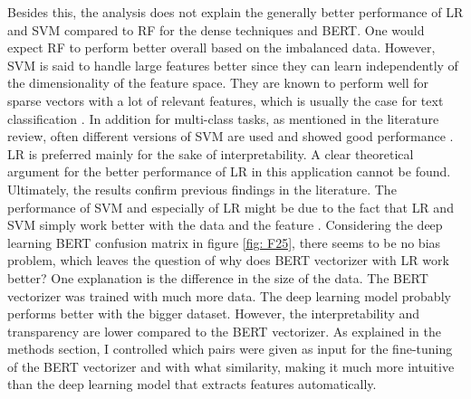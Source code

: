 \documentclass[12pt, a4paper, titlepage]{article}
\begin{document}
Besides this, the analysis does not explain the generally better performance of LR and SVM compared to RF for the dense techniques and \ac{BERT}. One would expect RF to perform better overall based on the imbalanced data. However, \ac{SVM} is said to handle large features better since they can learn independently of the dimensionality of the feature space. They are known to perform well for sparse vectors with a lot of relevant features, which is usually the case for text classification \citep{Joachims1998}. In addition for multi-class tasks, as mentioned in the literature review, often different versions of \ac{SVM} are used and showed good performance \citep{Aiolli2005, Angulo2003,Benabdeslem2006, guo2015, Mayoraz1999,Tang2019,tomar2015comparison}. \ac{LR} is preferred mainly for the sake of interpretability. A clear theoretical argument for the better performance of LR in this application cannot be found. Ultimately, the results confirm previous findings in the literature. The performance of SVM and especially of \ac{LR} might be due to the fact that \ac{LR} and \ac{SVM} simply work better with the data and the feature \citep{maglogiannis2007}. Considering the deep learning \ac{BERT} confusion matrix in figure \ref{fig: F25}, there seems to be no bias problem, which leaves the question of why does \ac{BERT} vectorizer with \ac{LR} work better? One explanation is the difference in the size of the data. The \ac{BERT} vectorizer was trained with much more data. The deep learning model probably performs better with the bigger dataset. However, the interpretability and transparency are lower compared to the \ac{BERT} vectorizer. As explained in the methods section, I controlled which pairs were given as input for the fine-tuning of the \ac{BERT} vectorizer and with what similarity, making it much more intuitive than the deep learning model that extracts features automatically. 
\end{document}
